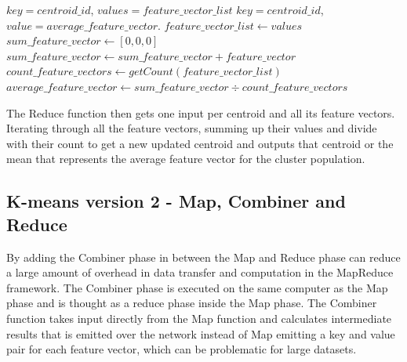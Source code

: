 \begin{center}
\newcommand{\map}{\ensuremath{\mbox{\sc Kmeans version 1: Reduce}}}
\begin{algorithm}[h!]
\caption{$\map(key,value)$}\label{alg:reducekmeansv1}
\begin{algorithmic}[1]
\REQUIRE $key = centroid\_id$, $values = feature\_vector\_list$
\ENSURE $key = centroid\_id$, $value = average\_feature\_vector$.
\STATE $feature\_vector\_list \leftarrow values$
\medskip
\STATE $sum\_feature\_vector \leftarrow [0, 0, 0]$
	\STATE $sum\_feature\_vector \leftarrow sum\_feature\_vector + feature\_vector$
\ENDFOR
\medskip
\STATE $count\_feature\_vectors \leftarrow getCount(feature\_vector\_list)$
\STATE $average\_feature\_vector \leftarrow sum\_feature\_vector \div count\_feature\_vectors$
\medskip
{}
\end{algorithmic}
\end{algorithm}
\end{center}

The Reduce function then gets one input per centroid and all its feature vectors. Iterating through all the feature vectors, summing up their values and divide with their count to get a new updated centroid and outputs that centroid or the mean that represents the average feature vector for the cluster population.


\subsection{K-means version 2 - Map, Combiner and Reduce}
\label{sec:MapCombineReduceVersion}
By adding the Combiner phase in between the Map and Reduce phase can reduce a large amount of overhead in data transfer and computation in the MapReduce framework. The Combiner phase is executed on the same computer as the Map phase and is thought as a reduce phase inside the Map phase. The Combiner function takes input directly from the Map function and calculates intermediate results that is emitted over the network instead of Map emitting a key and value pair for each feature vector, which can be problematic for large datasets.

